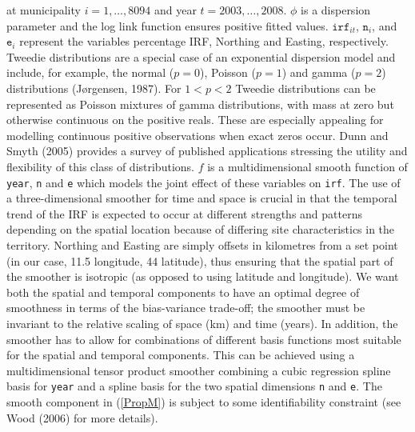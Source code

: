 at municipality $i=1,\ldots,8094$ and year $t=2003,\ldots,2008$. $\phi$ is a dispersion parameter and the log link function ensures positive fitted values. $\texttt{irf}_{it}$, $\texttt{n}_i$, and $\texttt{e}_i$ represent the variables percentage IRF, Northing and Easting, respectively. Tweedie distributions are a special case of an exponential dispersion model and include, for example, the normal ($p=0$), Poisson ($p=1$) and gamma ($p=2$) distributions (J\o rgensen, 1987). For $1<p<2$ Tweedie distributions can be represented as Poisson mixtures of gamma distributions, with mass at zero but otherwise continuous on the positive reals. These are especially appealing for modelling continuous positive observations when exact zeros occur. Dunn and Smyth (2005) provides a survey of published applications stressing the utility and flexibility of this class of distributions. $f$ is a multidimensional smooth function of \texttt{year}, \texttt{n} and \texttt{e} which models the joint effect of these variables on \texttt{irf}. The use of a three-dimensional smoother for time and space is crucial in that the temporal trend of the IRF is expected to occur at different strengths and patterns depending on the spatial location because of differing site characteristics in the territory. Northing and Easting are simply offsets in kilometres from a set point (in our case, 11.5 longitude, 44 latitude), thus ensuring that the spatial part of the smoother is isotropic (as opposed to using latitude and longitude). We want both the spatial and temporal components to have an optimal degree of smoothness in terms of the bias-variance trade-off; the smoother must be invariant to the relative scaling of space (km) and time (years). In addition, the smoother has to allow for combinations of different basis functions most suitable for the spatial and temporal components. This can be achieved using a multidimensional tensor product smoother combining a cubic regression spline basis for \texttt{year} and a spline basis for the two spatial dimensions \texttt{n} and \texttt{e}. The smooth component in (\ref{PropM}) is subject to some identifiability constraint (see Wood (2006) for more details).


